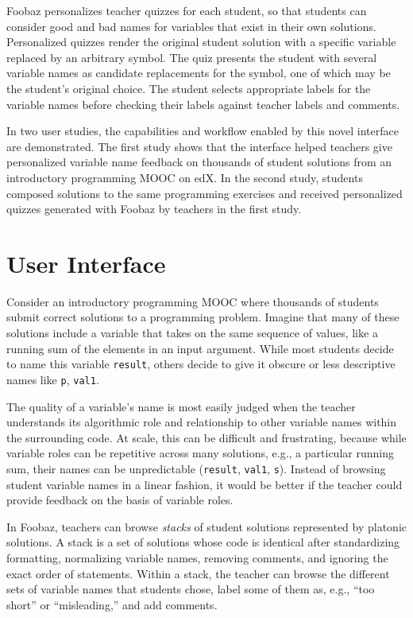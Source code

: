 Foobaz personalizes teacher quizzes for each student, so that students can consider good and bad names for variables that exist in their own solutions. Personalized quizzes render the original student solution with a specific variable replaced by an arbitrary symbol. The quiz presents the student with several variable names as candidate replacements for the symbol, one of which may be the student's original choice. The student selects appropriate labels for the variable names before checking their labels against teacher labels and comments.

In two user studies, the capabilities and workflow enabled by this novel interface are demonstrated. The first study shows that the interface helped teachers give personalized variable name feedback on thousands of student solutions from an introductory programming MOOC on edX. In the second study, students composed solutions to the same programming exercises and received personalized quizzes generated with Foobaz by teachers in the first study.


\section{User Interface}

Consider an introductory programming MOOC where thousands of students submit correct solutions to a programming problem. Imagine that many of these solutions include a variable that takes on the same sequence of values, like a running sum of the elements in an input argument. While most students decide to name this variable \texttt{result}, others decide to give it obscure or less descriptive names like \texttt{p}, \texttt{val1}.

The quality of a variable's name is most easily judged when the teacher understands its algorithmic role and relationship to other variable names within the surrounding code. At scale, this can be difficult and frustrating, because while variable roles can be repetitive across many solutions, e.g., a particular running sum, their names can be unpredictable (\texttt{result}, \texttt{val1}, \texttt{s}). Instead of browsing student variable names in a linear fashion, it would be better if the teacher could provide feedback on the basis of variable roles.

In Foobaz, teachers can browse \emph{stacks} of student solutions represented by platonic solutions. A stack is a set of solutions whose code is identical after standardizing formatting, normalizing variable names, removing comments, and ignoring the exact order of statements. Within a stack, the teacher can browse the different sets of variable names that students chose, label some of them as, e.g., ``too short'' or ``misleading,'' and add comments. 

